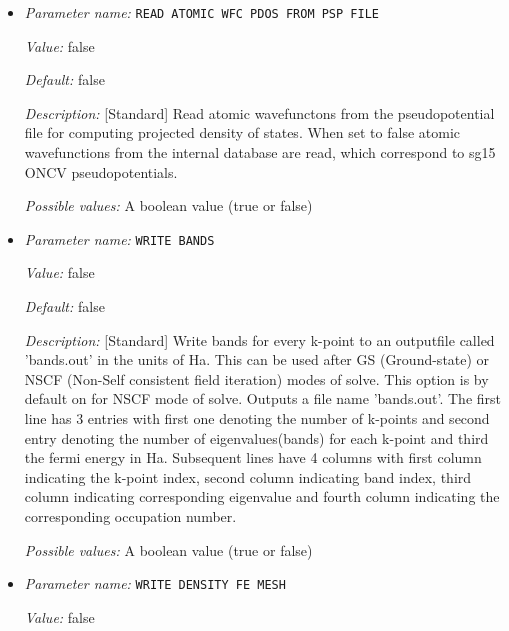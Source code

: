 \begin{itemize}
\item {\it Parameter name:} {\tt READ ATOMIC WFC PDOS FROM PSP FILE}
\label{parameters:Post_2dprocessing Options/READ ATOMIC WFC PDOS FROM PSP FILE}
\label{parameters:Post_2dprocessing_20Options/READ_20ATOMIC_20WFC_20PDOS_20FROM_20PSP_20FILE}


{\it Value:} false


{\it Default:} false


{\it Description:} [Standard] Read atomic wavefunctons from the pseudopotential file for computing projected density of states. When set to false atomic wavefunctions from the internal database are read, which correspond to sg15 ONCV pseudopotentials.


{\it Possible values:} A boolean value (true or false)
\item {\it Parameter name:} {\tt WRITE BANDS}
\label{parameters:Post_2dprocessing Options/WRITE BANDS}
\label{parameters:Post_2dprocessing_20Options/WRITE_20BANDS}


{\it Value:} false


{\it Default:} false


{\it Description:} [Standard] Write bands for every k-point to an outputfile called 'bands.out' in the units of Ha. This can be used after GS (Ground-state) or NSCF (Non-Self consistent field iteration) modes of solve. This option is by default on for NSCF mode of solve. Outputs a file name 'bands.out'. The first line has 3 entries with first one denoting the number of k-points and second entry denoting the number of eigenvalues(bands) for each k-point and third the fermi energy in Ha. Subsequent lines have 4 columns with first column indicating the k-point index, second column indicating band index, third column indicating corresponding eigenvalue and fourth column indicating the corresponding occupation number.


{\it Possible values:} A boolean value (true or false)
\item {\it Parameter name:} {\tt WRITE DENSITY FE MESH}
\label{parameters:Post_2dprocessing Options/WRITE DENSITY FE MESH}
\label{parameters:Post_2dprocessing_20Options/WRITE_20DENSITY_20FE_20MESH}


{\it Value:} false



\end{itemize}
